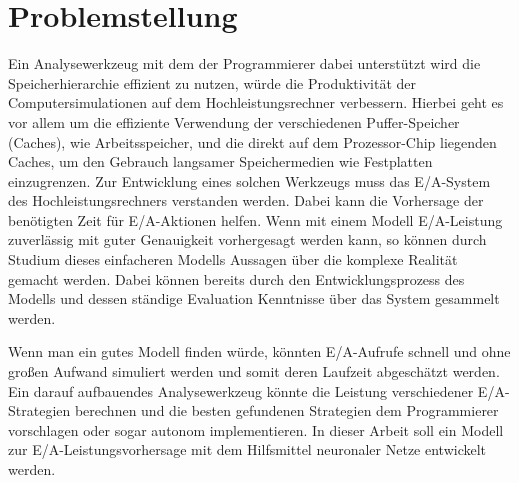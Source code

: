 \documentclass[
	twoside,
	12pt,
	a4paper,
	BCOR10mm,
	DIV14,
	listof=totoc,
	bibliography=totoc,
	headsepline
]{scrreprt}
\begin{document}
\section{Problemstellung}
Ein Analysewerkzeug mit dem der Programmierer dabei unterstützt wird die Speicherhierarchie effizient zu nutzen, würde die Produktivität der Computersimulationen auf dem Hochleistungsrechner verbessern.
Hierbei geht es vor allem um die effiziente Verwendung der verschiedenen Puffer-Speicher (Caches), wie Arbeitsspeicher, und die direkt auf dem Prozessor-Chip liegenden Caches, um den Gebrauch langsamer Speichermedien wie Festplatten einzugrenzen. 
Zur Entwicklung eines solchen Werkzeugs muss das E/A-System des Hochleistungsrechners verstanden werden.
Dabei kann die Vorhersage der benötigten Zeit für E/A-Aktionen helfen. Wenn mit einem Modell E/A-Leistung zuverlässig mit guter Genauigkeit vorhergesagt werden kann, so können durch Studium dieses einfacheren Modells Aussagen über die komplexe Realität gemacht werden.
Dabei können bereits durch den Entwicklungsprozess des Modells und dessen ständige Evaluation Kenntnisse über das System gesammelt werden.
  
Wenn man ein gutes Modell finden würde, könnten E/A-Aufrufe schnell und ohne großen Aufwand simuliert werden und somit deren Laufzeit abgeschätzt werden.
Ein darauf aufbauendes Analysewerkzeug könnte die Leistung verschiedener E/A-Strategien berechnen und die besten gefundenen Strategien dem Programmierer vorschlagen oder sogar autonom implementieren.  
In dieser Arbeit soll ein Modell zur E/A-Leistungsvorhersage mit dem Hilfsmittel neuronaler Netze entwickelt werden. 
\end{document}
